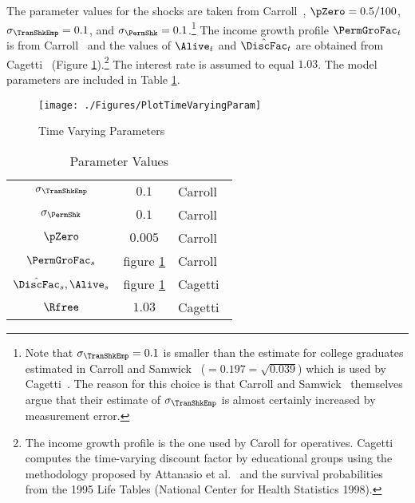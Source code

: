 \documentclass[titlepage, headings=optiontotocandhead]{Resources/texmf-local/tex/latex/econtex}
\begin{document}
The parameter values for the shocks are taken from Carroll~\citeyearpar{carroll:brookings}, $\pZero=0.5/100$, $\sigma _{\TranShkEmp }=0.1$, and $\sigma_{\PermShk}=0.1$.\footnote{Note that $\sigma _{\TranShkEmp}=0.1$ is smaller than the estimate for college graduates estimated in
  Carroll and Samwick~\citeyearpar{carroll&samwick:nature} ($=0.197=\sqrt{0.039}$) which is used by Cagetti~\citeyearpar{cagettiWprofiles}. The reason for this choice is that Carroll and Samwick~\citeyearpar{carroll&samwick:nature} themselves argue that their estimate of $\sigma_{\TranShkEmp }$ is almost certainly increased by measurement error.} The income growth profile $\PermGroFac_{t}$ is from Carroll~\citeyearpar{carrollBSLCPIH} and the values of $\Alive_{t}$ and $\hat{\DiscFac}_{t}$ are obtained from Cagetti~\citeyearpar{cagettiWprofiles} (Figure \ref{fig:TimeVaryingParam}).\footnote{The income growth profile is the one used by Caroll for operatives. Cagetti computes the time-varying discount factor by educational groups using the methodology proposed by Attanasio et al.~\citeyearpar{AttanasioBanksMeghirWeber} and the survival probabilities from the 1995 Life Tables (National Center for Health Statistics 1998).} The interest rate is assumed to equal $1.03$. The model parameters are included in Table \ref{table:StrEstParams}.

\hypertarget{PlotTimeVaryingParam}{}
\begin{figure}[h]
  \texttt{[image: ./Figures/PlotTimeVaryingParam]}
  \caption{Time Varying Parameters}
  \label{fig:TimeVaryingParam}
\end{figure}

\begin{table}[h]
  \caption{Parameter Values}\label{table:StrEstParams}
  \begin{center}
    \begin{tabular}{ccl}
      \hline\hline
      $\sigma _{\TranShkEmp}$    & $0.1$ & Carroll~\citeyearpar{carroll:brookings}
      \\ $\sigma _{\PermShk}$   & $0.1$ & Carroll~\citeyearpar{carroll:brookings}
      \\ $\pZero$           & $0.005$  & Carroll~\citeyearpar{carroll:brookings}
      \\ $\PermGroFac_{s}$        & figure \ref{fig:TimeVaryingParam} & Carroll~\citeyearpar{carrollBSLCPIH}
      \\ $\hat{\DiscFac}_{s},\Alive_{s}$ & figure \ref{fig:TimeVaryingParam} & Cagetti~\citeyearpar{cagettiWprofiles}
      \\$\Rfree$            & $1.03$  & Cagetti~\citeyearpar{cagettiWprofiles}\\
      \hline
    \end{tabular}
  \end{center}
\end{table}
\end{document}

